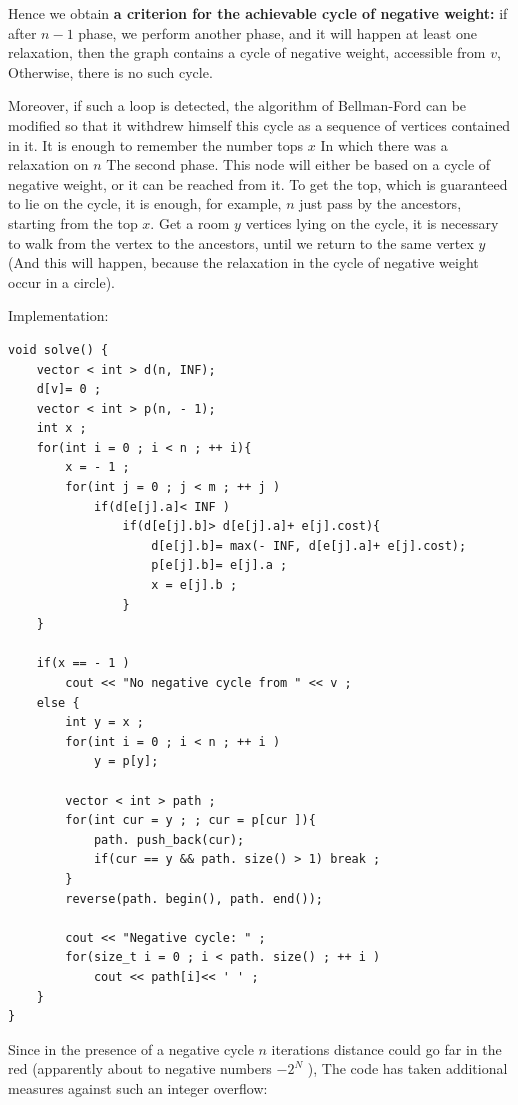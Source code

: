 Hence we obtain \textbf{a criterion for the achievable cycle of negative weight:} if after $n-1$ phase, we perform another phase, and it will happen at least one relaxation, then the graph contains a cycle of negative weight, accessible from $v$, Otherwise, there is no such cycle.

Moreover, if such a loop is detected, the algorithm of Bellman-Ford can be modified so that it withdrew himself this cycle as a sequence of vertices contained in it. It is enough to remember the number tops $x$ In which there was a relaxation on $n$ The second phase. This node will either be based on a cycle of negative weight, or it can be reached from it. To get the top, which is guaranteed to lie on the cycle, it is enough, for example, $n$ just pass by the ancestors, starting from the top $x$. Get a room $y$ vertices lying on the cycle, it is necessary to walk from the vertex to the ancestors, until we return to the same vertex $y$ (And this will happen, because the relaxation in the cycle of negative weight occur in a circle).

Implementation:

\begin{verbatim}
void solve() {
    vector < int > d(n, INF);
    d[v]= 0 ;
    vector < int > p(n, - 1);
    int x ;
    for(int i = 0 ; i < n ; ++ i){
        x = - 1 ;
        for(int j = 0 ; j < m ; ++ j )
            if(d[e[j].a]< INF )
                if(d[e[j].b]> d[e[j].a]+ e[j].cost){
                    d[e[j].b]= max(- INF, d[e[j].a]+ e[j].cost);
                    p[e[j].b]= e[j].a ;
                    x = e[j].b ;
                }
    }
 
    if(x == - 1 )
        cout << "No negative cycle from " << v ;
    else {
        int y = x ;
        for(int i = 0 ; i < n ; ++ i )
            y = p[y];
 
        vector < int > path ;
        for(int cur = y ; ; cur = p[cur ]){
            path. push_back(cur);
            if(cur == y && path. size() > 1) break ;
        }
        reverse(path. begin(), path. end());
 
        cout << "Negative cycle: " ;
        for(size_t i = 0 ; i < path. size() ; ++ i )
            cout << path[i]<< ' ' ;
    }
} 
\end{verbatim}
Since in the presence of a negative cycle $n$ iterations distance could go far in the red (apparently about to negative numbers $-2 ^ N$ ), The code has taken additional measures against such an integer overflow:

